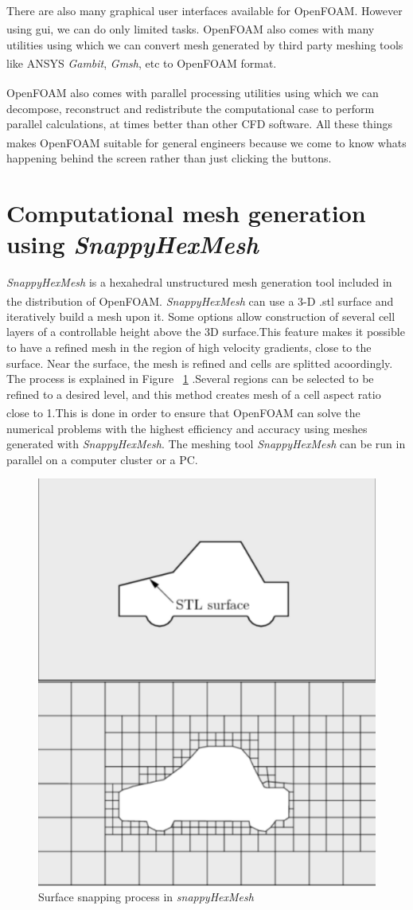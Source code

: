  

There are also many graphical user interfaces available for OpenFOAM\textsuperscript{\textregistered}. However using gui, we can do only limited tasks. OpenFOAM\textsuperscript{\textregistered} also comes with many utilities using which we can convert mesh generated by third party meshing tools like ANSYS\textsuperscript{\textregistered} \textit{Gambit}, \textit{Gmsh}, etc to OpenFOAM\textsuperscript{\textregistered} format.

OpenFOAM\textsuperscript{\textregistered} also comes with parallel processing utilities using which we can decompose, reconstruct and redistribute the computational case to perform parallel calculations, at times better than other CFD software. All these things makes OpenFOAM\textsuperscript{\textregistered} suitable for general engineers because we come to know whats happening behind the screen rather than just clicking the buttons. 


\section{Computational mesh generation using \textit{SnappyHexMesh}}
\label{mesh}

\textit{SnappyHexMesh} is a hexahedral unstructured mesh generation tool included in the distribution of OpenFOAM\textsuperscript{\textregistered}. \textit{SnappyHexMesh} can use a 3-D .stl surface and iteratively build a mesh upon it. Some options allow construction of several cell layers of a controllable height above the 3D surface.This feature makes it possible to have a refined mesh in the region of high velocity gradients, close to the surface.  Near the surface, the mesh is refined and cells are splitted acoordingly. The process is explained in Figure ~\ref{Snappy Hex Mesh} .Several regions can be selected to be refined to a desired level, and this method creates mesh of a cell aspect ratio close to 1.This is done in order to ensure that OpenFOAM\textsuperscript{\textregistered} can solve the numerical problems with the highest efficiency and accuracy using meshes generated with \textit{SnappyHexMesh}. The meshing tool \textit{SnappyHexMesh} can be run in parallel on a computer cluster or a PC.

\begin{figure}[H]
	\centering
	\includegraphics[width=180 pt]{mesh/snappyHexMesh.png}
	\caption{Surface snapping process in \textit{snappyHexMesh} }
	\label{Snappy Hex Mesh} %
\end{figure} 

